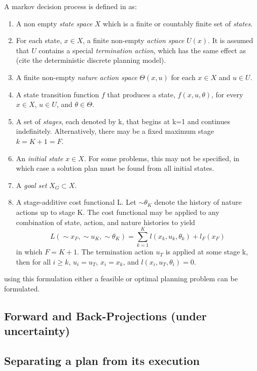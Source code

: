 A markov decision process is defined in \cite[pg.498]{Lav06} as:
\begin{enumerate}
\item A non empty \textit{state space} \(X\) which is a finite or countably
  finite set of \textit{states}.
\item For each state, \(x \in X\), a finite non-empty \textit{action space}
  \(U(x)\). It is assumed that \(U\) contains a special \textit{termination
    action}, which has the same effect as (cite the deterministic discrete
  planning model).
\item A finite non-empty \textit{nature action space} \(\Theta(x,u)\) for each
  \(x \in X\) and \(u \in U\).
\item A state transition function \(f\) that produces a state,
  \(f(x,u,\theta)\), for every \(x \in X\), \(u \in U\), and \(\theta \in
  \Theta\).
\item A set of \textit{stages}, each denoted by k, that begins at k=1 and
  continues indefinitely. Alternatively, there may be a fixed maximum stage \(k
  = K+1=F\).
\item An \textit{initial state} \(x \in X\). For some problems, this may not be
  specified, in which case a solution plan must be found from all initial
  states.

\item A \textit{goal set} \(X_G \subset X\).
\item A stage-additive cost functional L. Let \(\sim{\theta}_K\) denote the
  history of nature actions up to stage K. The cost functional may be applied to
  any combination of state, action, and nature histories to yield
  \[
    L(\sim{x}_F, \sim{u}_K, \sim{\theta}_K) = \sum_{k=1}^{K} l(x_k,u_k,\theta_k)
    + l_F(x_F)
  \]
  in which \(F = K + 1\). The termination action \(u_T\) is applied at some
  stage k, then for all \(i \geq k\), \(u_i = u_T\), \(x_i = x_k\), and
  \(l(x_i,u_T, \theta_i) = 0\).
\end{enumerate}
\cite[pg 498]{Lav06}

using this formulation either a feasible or optimal planning problem can be
formulated.

\subsection{Forward and Back-Projections (under uncertainty)}

\subsection{Separating a plan from its execution}

